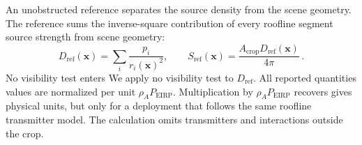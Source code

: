 \documentclass{IEEEoj} %
\providecommand{\DIFadd}[1]{{\protect\color{blue} \sf #1}} %
\providecommand{\DIFdel}[1]{{\protect\color{red} \scriptsize #1}} %
\providecommand{\DIFaddbegin}{} %
\providecommand{\DIFaddend}{} %
\providecommand{\DIFdelbegin}{} %
\providecommand{\DIFdelend}{} %
\begin{document}
An unobstructed reference separates \DIFdelbegin \DIFdel{the source density from the scene geometry. The reference sums the inverse-square contribution of every roofline segment}\DIFdelend \DIFaddbegin \DIFadd{source strength from scene geometry}\DIFaddend :
\begin{equation}
D_{\mathrm{ref}}(\mathbf{x})=
\sum_i\frac{p_i}{r_i(\mathbf{x})^2},
\qquad
S_{\mathrm{ref}}(\mathbf{x})=
\frac{A_{\mathrm{crop}}D_{\mathrm{ref}}(\mathbf{x})}{4\pi} \, .
\label{eq:reference-scale}
\end{equation}
\DIFdelbegin \DIFdel{No visibility test enters }\DIFdelend \DIFaddbegin \DIFadd{We apply no visibility test to }\DIFaddend $D_{\mathrm{ref}}$. All reported \DIFdelbegin \DIFdel{quantities }\DIFdelend \DIFaddbegin \DIFadd{values }\DIFaddend are
normalized per unit $\rho_A P_{\mathrm{EIRP}}$. Multiplication by
$\rho_A P_{\mathrm{EIRP}}$ \DIFdelbegin \DIFdel{recovers }\DIFdelend \DIFaddbegin \DIFadd{gives }\DIFaddend physical units, but only for a deployment
that follows the same roofline transmitter model. The calculation omits
transmitters and interactions outside the crop.
\end{document}
